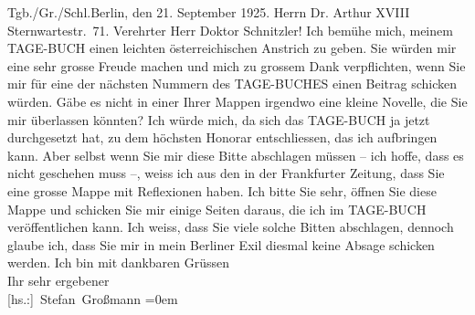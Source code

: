 \begin{ledgroupsized}[t]{13cm}
           \pstart
           \noindent{}Tgb./Gr./Schl.\hfill Berlin, den 21. September
                     1925.\pend
           \pstart
           \raggedleft{}Herrn\pend
           \pstart
           \noindent{}\raggedleft{}Dr. Arthur \pend
           \pstart
           \noindent{}\raggedleft{} XVIII\pend
           {\bigskip}\pstart
           \noindent{}\raggedleft{}Sternwartestr. 71. \pend
           \pstart\center{}Verehrter Herr Doktor Schnitzler!\pend\pstart
           Ich bemühe mich, meinem TAGE-BUCH einen leichten österreichischen Anstrich
               zu geben. Sie würden mir eine sehr grosse Freude machen und mich zu grossem Dank
               verpflichten, wenn Sie mir für eine der nächsten Nummern des TAGE-BUCHES einen Beitrag schicken würden. Gäbe es nicht in einer Ihrer Mappen irgendwo
               eine kleine Novelle, die Sie mir überlassen könnten? Ich würde mich, da sich das TAGE-BUCH ja jetzt durchgesetzt hat, zu dem höchsten Honorar entschliessen, das ich
               aufbringen kann. Aber selbst wenn Sie mir diese Bitte abschlagen müssen – ich hoffe,
               dass es nicht geschehen muss –, weiss ich aus den \label{K_L02449-1v}\label{K_L02449-1h} in der Frankfurter Zeitung,
               dass Sie eine grosse Mappe mit Reflexionen haben. Ich bitte Sie sehr, öffnen Sie
               diese Mappe und schicken Sie mir einige Seiten daraus, die ich im {\pb}TAGE-BUCH veröffentlichen kann. Ich weiss, dass Sie viele solche Bitten abschlagen,
               dennoch glaube ich, dass Sie mir in mein Berliner
               Exil diesmal keine Absage schicken werden.\pend
           \pstart
           Ich bin mit dankbaren Grüssen{\\[\baselineskip]}Ihr sehr ergebener{\\[\baselineskip]}\spacefill\mbox{{[}hs.:{]} Stefan Großmann}\pend
           \leftskip=0em{}
         
         \endnumbering{}\end{ledgroupsized}  \newcommand{\dateiname}{L02449}\newcommand{\titel}{Stefan Großmann an Arthur Schnitzler, 21. 9. 1925}\newcommand{\editorInnen}{ Martin Anton Müller und Gerd-Hermann Susen}
      